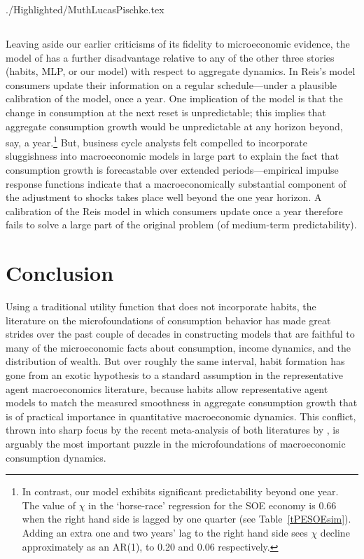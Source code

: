 \begin{verbatimwrite}{./Highlighted/MuthLucasPischke.tex}
\subsection{\cite{reis:inattentive}}

Leaving aside our earlier criticisms of its fidelity to microeconomic evidence, the model of \cite{reis:inattentive} has a further disadvantage relative to any of the other three stories (habits, MLP, or our model) with respect to aggregate dynamics. In Reis's model consumers update their information on a regular schedule---under a plausible calibration of the model, once a year. One implication of the model is that the change in consumption at the next reset is unpredictable; this implies that aggregate consumption growth would be unpredictable at any horizon beyond, say, a year.\footnote{In contrast, our model exhibits significant predictability beyond one year. The value of $\chi$ in the `horse-race' regression for the SOE economy is 0.66 when the right hand side is lagged by one quarter (see Table~\ref{tPESOEsim}). Adding an extra one and two years' lag to the right hand side sees $\chi$ decline approximately as an AR(1), to 0.20 and 0.06 respectively.}  But, business cycle analysts felt compelled to incorporate sluggishness into macroeconomic models in large part to explain the fact that consumption growth is forecastable over extended periods---empirical impulse response functions indicate that a macroeconomically substantial component of the adjustment to shocks takes place well beyond the one year horizon.  A calibration of the Reis model in which consumers update once a year therefore fails to solve a large part of the original problem (of medium-term predictability).

\end{verbatimwrite}



\section{Conclusion} \label{sec:Conclusion}

Using a traditional utility function that does not incorporate habits, the literature on the microfoundations of consumption behavior has made great strides over the past couple of decades in constructing models that are faithful to many of the microeconomic facts about consumption, income dynamics, and the distribution of wealth.  But over roughly the same interval, habit formation has gone from an exotic hypothesis to a standard assumption in the representative agent macroeconomics literature, because habits allow representative agent models to match the measured smoothness in aggregate consumption growth that is of practical importance in quantitative macroeconomic dynamics.  This conflict, thrown into sharp focus by the recent meta-analysis of both literatures by \cite{hrsHabit}, is arguably the most important puzzle in the microfoundations of macroeconomic consumption dynamics.

